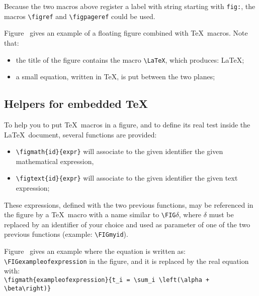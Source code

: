 \documentclass[book]{upmethodology-document}
\begin{document}
Because the two macros above register a label with string starting with \texttt{fig:}, the macros \texttt{{\textbackslash}figref} and \texttt{{\textbackslash}figpageref} could be used.


Figure~ gives an example of a floating figure combined with \TeX\ macros. Note that:
\begin{itemize}
\item the title of the figure contains the macro \texttt{{\textbackslash}LaTeX}, which produces: \LaTeX;
\item a small equation, written in \TeX, is put between the two planes;
\end{itemize}

\subsection{Helpers for embedded \TeX}

To help you to put \TeX\ macros in a figure, and to define its real test inside the \LaTeX\ document, several functions are provided:
\begin{itemize}
\item \texttt{{\textbackslash}figmath\{id\}\{expr\}} will associate to the given identifier the given mathematical expression,
\item \texttt{{\textbackslash}figtext\{id\}\{expr\}} will associate to the given identifier the given text expression;
\end{itemize}

These expressions, defined with the two previous functions, may be referenced in the figure by a \TeX\ macro with a name similar to \texttt{{\textbackslash}FIG$\delta$}, where $\delta$ must be replaced by an identifier of your choice and used as parameter of one of the two previous functions (example: \texttt{{\textbackslash}FIGmyid}).

Figure~ gives an example where the equation is written as: \texttt{{\textbackslash}FIGexampleofexpression} in the figure, and it is replaced by the real equation with: \\
\texttt{{\textbackslash}figmath\{exampleofexpression\}\{t\_i = {\textbackslash}sum\_i {\textbackslash}left({\textbackslash}alpha + {\textbackslash}beta{\textbackslash}right)\}}
\end{document}
